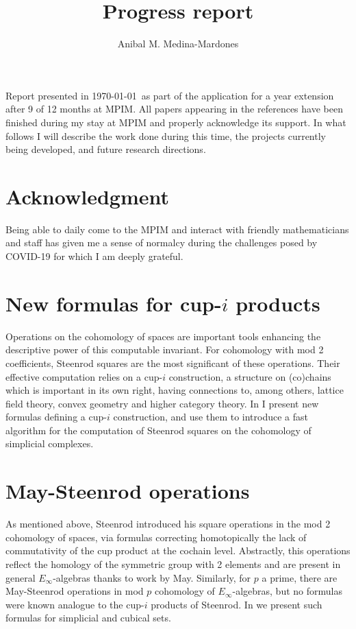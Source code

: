 \documentclass{amsart}
\theoremstyle{definition}
\begin{document}
	\title{Progress report}
	\author{Anibal M. Medina-Mardones}
			
	\vspace*{-1cm}
	
	\maketitle
	
	Report presented in \today\ as part of the application for a year extension after 9 of 12 months at MPIM.
	All papers appearing in the references have been finished during my stay at MPIM and properly acknowledge its support.
	In what follows I will describe the work done during this time, the projects currently being developed, and future research directions.
	
	\tableofcontents
	
	\section*{Acknowledgment}
	Being able to daily come to the MPIM and interact with friendly mathematicians and staff has given me a sense of normalcy during the challenges posed by COVID-19 for which I am deeply grateful.
	
	\section{New formulas for cup-$i$ products}
	Operations on the cohomology of spaces are important tools enhancing the descriptive power of this computable invariant. For cohomology with mod 2 coefficients, Steenrod squares are the most significant of these operations. Their effective computation relies on a cup-$i$ construction, a structure on (co)chains which is important in its own right, having connections to, among others, lattice field theory, convex geometry and higher category theory.
	In \cite{medina2021newformulas} I present new formulas defining a cup-$i$ construction, and use them to introduce a fast algorithm for the computation of Steenrod squares on the cohomology of simplicial complexes. 
	
	\section{May-Steenrod operations}
	As mentioned above, Steenrod introduced his square operations in the mod 2 cohomology of spaces, via formulas correcting homotopically the lack of commutativity of the cup product at the cochain level.
	Abstractly, this operations reflect the homology of the symmetric group with 2 elements and are present in general $E_\infty$-algebras thanks to work by May.
	Similarly, for $p$ a prime, there are May-Steenrod operations in mod $p$ cohomology of $E_\infty$-algebras, but no formulas were known analogue to the cup-$i$ products of Steenrod.
	In \cite{medina2020odd} we present such formulas for simplicial and cubical sets.
	
\end{document}
